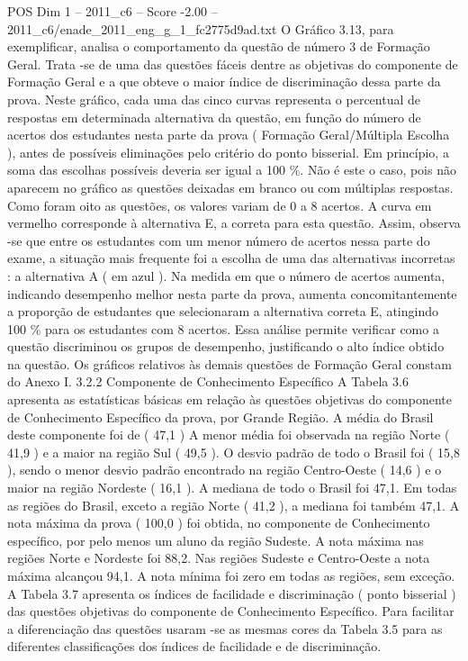 \begin{textsample}{POS Dim 1 – 2011\_c6 – Score -2.00 – 2011\_c6/enade\_2011\_eng\_g\_1\_fc2775d9ad.txt}
O Gráfico 3.13, para exemplificar, analisa o comportamento da questão de número 3 de Formação Geral.
Trata -se de uma das questões fáceis dentre as objetivas do componente de Formação Geral e a que obteve o maior índice de discriminação dessa parte da prova.
Neste gráfico, cada uma das cinco curvas representa o percentual de respostas em determinada alternativa da questão, em função do número de acertos dos estudantes nesta parte da prova ( Formação Geral/Múltipla Escolha ), antes de possíveis eliminações pelo critério do ponto bisserial.
Em princípio, a soma das escolhas possíveis deveria ser igual a 100 \%.
Não é este o caso, pois não aparecem no gráfico as questões deixadas em branco ou com múltiplas respostas.
Como foram oito as questões, os valores variam de 0 a 8 acertos.
A curva em vermelho corresponde à alternativa E, a correta para esta questão.
Assim, observa -se que entre os estudantes com um menor número de acertos nessa parte do exame, a situação mais frequente foi a escolha de uma das alternativas incorretas : a alternativa A ( em azul ).
Na medida em que o número de acertos aumenta, indicando desempenho melhor nesta parte da prova, aumenta concomitantemente a proporção de estudantes que selecionaram a alternativa correta E, atingindo 100 \% para os estudantes com 8 acertos.
Essa análise permite verificar como a questão discriminou os grupos de desempenho, justificando o alto índice obtido na questão.
Os gráficos relativos às demais questões de Formação Geral constam do Anexo I. 3.2.2 Componente de Conhecimento Específico A Tabela 3.6 apresenta as estatísticas básicas em relação às questões objetivas do componente de Conhecimento Específico da prova, por Grande Região.
A média do Brasil deste componente foi de ( 47,1 ) A menor média foi observada na região Norte ( 41,9 ) e a maior na região Sul ( 49,5 ).
O desvio padrão de todo o Brasil foi ( 15,8 ), sendo o menor desvio padrão encontrado na região Centro-Oeste ( 14,6 ) e o maior na região Nordeste ( 16,1 ).
A mediana de todo o Brasil foi 47,1.
Em todas as regiões do Brasil, exceto a região Norte ( 41,2 ), a mediana foi também 47,1.
A nota máxima da prova ( 100,0 ) foi obtida, no componente de Conhecimento específico, por pelo menos um aluno da região Sudeste.
A nota máxima nas regiões Norte e Nordeste foi 88,2.
Nas regiões Sudeste e Centro-Oeste a nota máxima alcançou 94,1.
A nota mínima foi zero em todas as regiões, sem exceção.
A Tabela 3.7 apresenta os índices de facilidade e discriminação ( ponto bisserial ) das questões objetivas do componente de Conhecimento Específico.
Para facilitar a diferenciação das questões usaram -se as mesmas cores da Tabela 3.5 para as diferentes classificações dos índices de facilidade e de discriminação.

\end{textsample}
